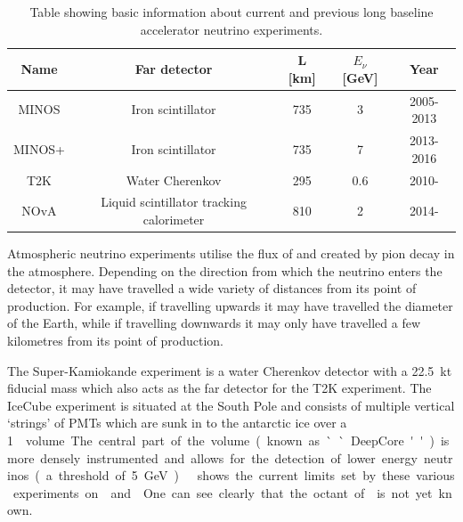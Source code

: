 \begin{table}
  \caption[Current and previous long baseline experiments.]{Table showing basic information about current and previous long baseline accelerator neutrino experiments.}
  \label{tab:lblExp}
  \centering
  \begin{tabular}{c c c c c}
    \hline
    \hline
    Name & Far detector & L [\si{\kilo\metre}] & $E_{\nu}$ [\si{\giga\electronvolt}] & Year \\
    \hline
    MINOS  & Iron scintillator                  & 735 & 3   & 2005-2013 \\
    MINOS+ & Iron scintillator                  & 735 & 7   & 2013-2016 \\
    T2K    & Water Cherenkov                    & 295 & 0.6 & 2010- \\
    NOvA   & Liquid scintillator tracking calorimeter & 810 & 2   & 2014- \\
    \hline
  \end{tabular}
\end{table}

Atmospheric neutrino experiments utilise the flux of \numu and \nue created by pion decay in the atmosphere.
Depending on the direction from which the neutrino enters the detector, it may have travelled a wide variety of distances from its point of production.
For example, if travelling upwards it may have travelled the diameter of the Earth, while if travelling downwards it may only have travelled a few kilometres from its point of production.

The Super-Kamiokande experiment is a water Cherenkov detector with a \SI{22.5}{\kilo\tonne} fiducial mass which also acts as the far detector for the T2K experiment.
The IceCube experiment is situated at the South Pole and consists of multiple vertical `strings' of PMTs which are sunk in to the antarctic ice over a \SI{1}{\km\cubic} volume.
The central part of the volume (known as ``DeepCore'') is more densely instrumented and allows for the detection of lower energy neutrinos (a threshold of \SI{5}{\giga\electronvolt})~\cite{icecube}.

 shows the current limits set by these various experiments on  and .
One can see clearly that the octant of  is not yet known.

